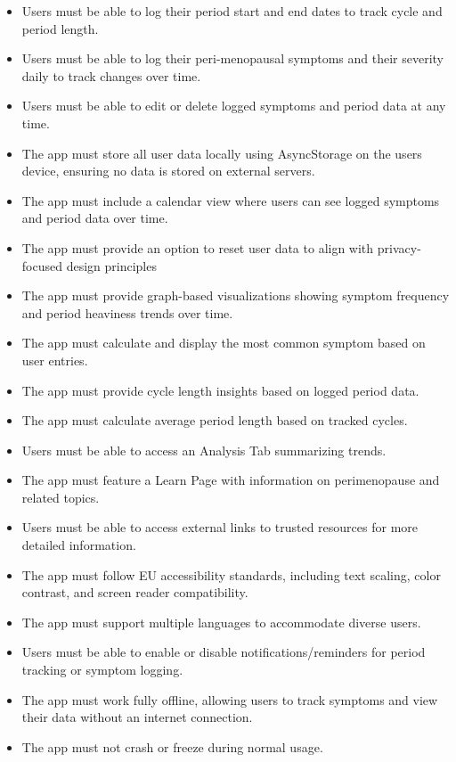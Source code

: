 \begin{itemize}
      \item Users must be able to log their period start and end dates to track cycle and period length.
      \item Users must be able to log their peri-menopausal symptoms and their severity daily to track changes over time.
      \item Users must be able to edit or delete logged symptoms and period data at any time.
      \item The app must store all user data locally using AsyncStorage on the users device, ensuring no data is stored on external servers.
      \item The app must include a calendar view where users can see logged symptoms and period data over time.
      \item The app must provide an option to reset user data to align with privacy-focused design principles
      \item The app must provide graph-based visualizations showing symptom frequency and period heaviness trends over time.
      \item The app must calculate and display the most common symptom based on user entries.
      \item The app must provide cycle length insights based on logged period data.
      \item The app must calculate average period length based on tracked cycles.
      \item Users must be able to access an Analysis Tab summarizing trends.
      \item The app must feature a Learn Page with information on perimenopause and related topics.
      \item Users must be able to access external links to trusted resources for more detailed information.
      \item The app must follow EU accessibility standards, including text scaling, color contrast, and screen reader compatibility.
      \item The app must support multiple languages to accommodate diverse users.
      \item Users must be able to enable or disable notifications/reminders for period tracking or symptom logging.
      \item The app must work fully offline, allowing users to track symptoms and view their data without an internet connection.
      \item The app must not crash or freeze during normal usage.
\end{itemize}

